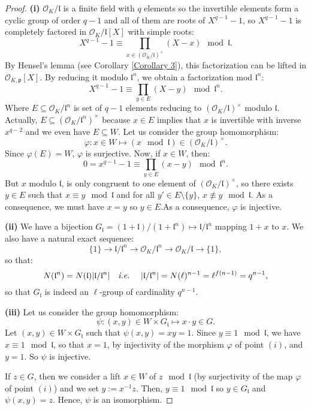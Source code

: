 \documentclass[a4paper,10pt]{report}
\theoremstyle{definition}
\theoremstyle{plain}
\theoremstyle{definition}
\newcommand{\ie}{\emph{i.e.}\ }
\newcommand{\mO}{\mathcal{O}}
\renewcommand{\(}{\left(}
\renewcommand{\)}{\right)}
\newcommand{\mf}[1]{\mathfrak{#1}}
\begin{document}
\begin{proof}
\textbf{(i)} $\mO_K/\mf{l}$ is a finite field with $q$ elements so the invertible elements form a cyclic group of order $q-1$ and all of them are roots of $X^{q-1}-1$, so $X^{q-1}-1$ is completely factored in $\mO_K/\mf{l}[X]$ with simple roots:
\[X^{q-1}-1\equiv \prod_{x\in(\mO_K/\mf{l})^\times}(X-x) \mod \mf{l}.\]
By Hensel's lemma (see Corollary \ref{Corollary 3}), this factorization can be lifted in $\mO_{K,\mf{p}}[X]$. By reducing it modulo $\mf{l}^n$, we obtain a factorization mod $\mf{l}^n$:
\[X^{q-1}-1\equiv \prod_{y\in E}(X-y) \mod \mf{l}^n.\] 
Where $E\subseteq \mO_K/\mf{l}^n$ is set of $q-1$ elements reducing to $(\mO_K/\mf{l})^\times$ modulo $\mf{l}$. Actually, $E\subseteq (\mO_K/\mf{l}^n)^\times$ because $x\in E$ implies that $x$ is invertible with inverse $x^{q-2}$ and we even have $E\subseteq W$. Let us consider the group homomorphism:
\[\varphi: x\in W\longmapsto (x \mod \mf{l})\in(\mO_K/\mf{l})^\times.\]
Since $\varphi(E)=W$, $\varphi$ is surjective.  Now, if $x\in W$, then:
\[0=x^{q-1}-1\equiv \prod_{y\in E}(x-y) \mod \mf{l}^n.\]
But $x$ modulo $\mf{l}$, is only congruent to one element of $(\mO_K/\mf{l})^\times$, so there exists $y\in E$ such that $x\equiv y \mod \mf{l}$ and for all $y'\in E\setminus\{y\}$,  $x\not\equiv y \mod \mf{l}$. As a consequence, we must have $x=y$ so $y\in E$.As a consequence, $\varphi$ is injective.

\textbf{(ii)} We have a bijection $G_{\mf{l}}=(1+\mf{l})/(1+\mf{l}^n)\longmapsto \mf{l}/\mf{l}^n$ mapping $1+x$ to $x$. We also have a natural exact sequence:
\[\{1\}\longrightarrow \mf{l}/\mf{l}^n\longrightarrow \mO_K/\mf{l}^n\longrightarrow\mO_K/\mf{l}\longrightarrow\{1\},\]
so that:
\[N(\mf{l}^n)=N(\mf{l})|\mf{l}/\mf{l}^n| \quad \mbox{\ie} \quad |\mf{l}/\mf{l}^n|=N(\ell)^{n-1}=\ell^{f(n-1)}=q^{n-1},\]
so that $G_{\mf{l}}$ is indeed an $\ell$-group of cardinality $q^{n-1}$.

\textbf{(iii)} Let us consider the group homomorphism:
\[\psi: (x,y)\in W\times G_{\mf{l}}\longmapsto x\cdot y\in G.\]
Let $(x,y)\in W\times G_{\mf{l}}$ such that $\psi(x,y)=xy=1$. Since $y\equiv 1 \mod \mf{l}$, we have $x\equiv 1 \mod \mf{l}$, so that $x=1$, by injectivity of the morphism $\varphi$ of point $(i)$, and $y=1$. So $\psi$ is injective. 

If $z\in G$, then we consider a lift $x\in W$ of $z \mod \mf{l}$ (by surjectivity of the map $\varphi$ of point $(i)$) and we set $y:=x^{-1}z$. Then, $y\equiv 1 \mod \mf{l}$ so $y\in G_{\mf{l}}$ and $\psi(x,y)=z$. Hence, $\psi$ is an isomorphism.
 
\end{proof}
\end{document}
